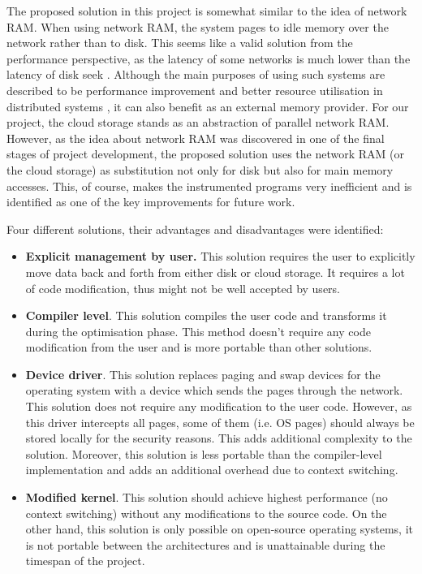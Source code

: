 \documentclass[bsc,frontabs,twoside,singlespacing,parskip,deptreport]{infthesis}     %
\begin{document}
The proposed solution in this project is somewhat similar to the idea of network RAM. When using network RAM, the system pages to idle memory over the network rather than to disk. This seems like a valid solution from the performance perspective, as the latency of some networks is much lower than the latency of disk seek \citep{numbers_should_know}. Although the main purposes of using such systems are described to be performance improvement \citep{Anderson:1998:ENR:893677} and better resource utilisation in distributed systems \citep{1327942}, it can also benefit as an external memory provider. For our project, the cloud storage stands as an abstraction of parallel network RAM. However, as the idea about network RAM was discovered in one of the final stages of project development, the proposed solution uses the network RAM (or the cloud storage) as substitution not only for disk but also for main memory accesses. This, of course, makes the instrumented programs very inefficient and is identified as one of the key improvements for future work.


Four different solutions, their advantages and disadvantages were identified:

\begin{itemize}
\item
\textbf{Explicit management by user.} This solution requires the user to explicitly move data back and forth from either disk or cloud storage. It requires a lot of code modification, thus might not be well accepted by users.
\item
\textbf{Compiler level}. This solution compiles the user code and transforms it during the optimisation phase. This method doesn't require any code modification from the user and is more portable than other solutions.
\item
\textbf{Device driver}. This solution replaces paging and swap devices for the operating system with a device which sends the pages through the network. This solution does not require any modification to the user code. However, as this driver intercepts all pages, some of them (i.e. OS pages) should always be stored locally for the security reasons. This adds additional complexity to the solution. Moreover, this solution is less portable than the compiler-level implementation and adds an additional overhead due to context switching.
\item
\textbf{Modified kernel}. This solution should achieve highest performance (no context switching) without any modifications to the source code. On the other hand, this solution is only possible on open-source operating systems, it is not portable between the architectures and is unattainable during the timespan of the project.
\end{itemize}
\end{document}
